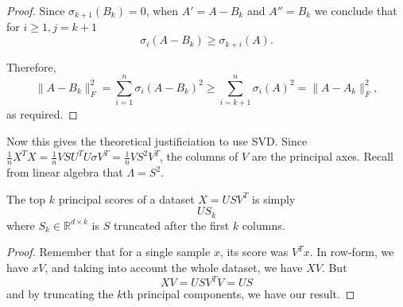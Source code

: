 \begin{proof}
    Since $\sigma_{k+1}(B_k) = 0$, when $A' = A - B_k$ and $A'' = B_k$ we conclude that for $i \geq 1, j = k + 1$
    \begin{equation}
      \sigma_i(A - B_k) \geq \sigma_{k+i}(A).
    \end{equation}

    Therefore,
    \begin{equation}
      \|A - B_k\|_F^2 = \sum_{i=1}^n \sigma_i(A - B_k)^2 \geq \sum_{i=k+1}^n \sigma_i(A)^2 = \|A - A_k\|_F^2,
    \end{equation}
    as required.
  \end{proof}

  Now this gives the theoretical justificiation to use SVD. Since $\frac{1}{n} X^T X = \frac{1}{n} V S U^T U \sigma V^T = \frac{1}{n} V S^2 V^T$, the columns of $V$ are the principal axes. Recall from linear algebra that $\Lambda = S^2$. 

  \begin{theorem}
    The top $k$ principal scores of a dataset $X = U S V^T$ is simply  
    \begin{equation}
      U S_k
    \end{equation}
    where $S_k \in \mathbb{R}^{d \times k}$ is $S$ truncated after the first $k$ columns. 
  \end{theorem}
  \begin{proof}
    Remember that for a single sample $x$, its score was $V^T x$. In row-form, we have $x V$, and taking into account the whole dataset, we have $XV$. But 
    \begin{equation}
      XV = U S V^T V = US
    \end{equation}
    and by truncating the $k$th principal components, we have our result.  
  \end{proof}

